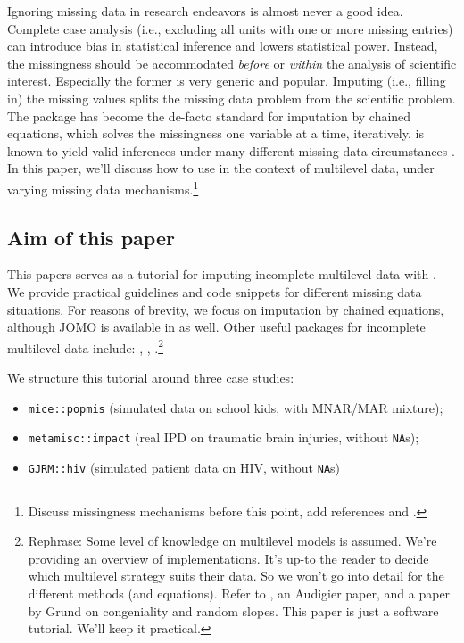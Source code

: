 \documentclass[
]{jss}
\begin{document}
Ignoring missing data in research endeavors is almost never a good idea.
Complete case analysis (i.e., excluding all units with one or more
missing entries) can introduce bias in statistical inference and lowers
statistical power. Instead, the missingness should be accommodated
\emph{before} or \emph{within} the analysis of scientific interest.
Especially the former is very generic and popular. Imputing (i.e.,
filling in) the missing values splits the missing data problem from the
scientific problem. The  package  has become the
de-facto standard for imputation by chained equations, which solves the
missingness one variable at a time, iteratively.  is known to
yield valid inferences under many different missing data circumstances
\citep{buur18}. In this paper, we'll discuss how to use  in
the context of multilevel data, under varying missing data
mechanisms.\footnote{Discuss missingness mechanisms before this point,
  add references \citet{yuce08} and \citet{hox15}.}

\hypertarget{aim-of-this-paper}{%
\subsection{Aim of this paper}\label{aim-of-this-paper}}

This papers serves as a tutorial for imputing incomplete multilevel data
with . We provide practical guidelines and code snippets for
different missing data situations. For reasons of brevity, we focus on
imputation by chained equations, although JOMO is available in
 as well. Other useful packages for incomplete multilevel data
include: , , .\footnote{Rephrase:
  Some level of knowledge on multilevel models is assumed. We're
  providing an overview of implementations. It's up-to the reader to
  decide which multilevel strategy suits their data. So we won't go into
  detail for the different methods (and equations). Refer to
  \citet{meng94}, an Audigier paper, and a paper by Grund on
  congeniality and random slopes. This paper is just a software
  tutorial. We'll keep it practical.}

We structure this tutorial around three case studies:

\begin{itemize}
\item
  \texttt{mice::popmis} (simulated data on school kids, with MNAR/MAR
  mixture);
\item
  \texttt{metamisc::impact} (real IPD on traumatic brain injuries,
  without \texttt{NA}s);
\item
  \texttt{GJRM::hiv} (simulated patient data on HIV, without
  \texttt{NA}s)
\end{itemize}
\end{document}
